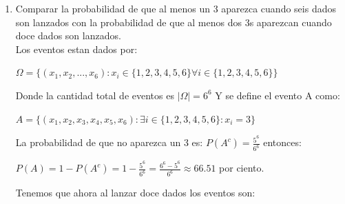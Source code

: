 \documentclass[12pt,a4paper]{report}
\begin{document}
\begin{enumerate}
{\begin{enumerate}[label=\alph*) ]
{\begin{center}
$P(A)=1-P(A^c)=1-\frac{5^4}{6^4}=\frac{6^4-5^4}{6^4}=\frac{671}{1296} $
\end{center}
Ahora, tenemos que el conjunto $\Omega_{1}$ de eventos es:\\
\begin{center}
$\Omega_{1} = \lbrace (x_{1},x_{2},...,x_{24}) : x_{i}\in R^2 \ i \in  \lbrace 1,2,...,24 \rbrace \rbrace$
\end{center}
Donde cada $x_{i}$ elemento de la sucesion de tiros es el tiro de dos dados $(x_{i_{1}},x_{i_{2}})$.
Al tirar dos dados hay así $6^2$ posibilidades y al ser 24 tiros son $(6^2)^{24}$ posibilidades. La probabilidad de que no se obtenga ningun doble cinco esta dada por:\\
\begin{center}
$P(B^c)= \frac{(5^2)^{24}}{(6^2)^{24}}=(\frac{25}{36})^{24}$
\end{center}
Entonces la probabilidad de que salga al menos un doble 5 es:\\
\begin{center}
$1-(\frac{25}{36})^{24}=\frac{1}{1}-\frac{5^{48}}{6^{48}}=\frac{6^{48}-5^{48}}{6^{48}}\approx 99.98$ por ciento.
\end{center}
    } 
    \item{Comparar la probabilidad de que al menos un 3 aparezca cuando seis dados son lanzados con la probabilidad de que al menos dos 3s aparezcan cuando doce dados son lanzados.\\
    Los eventos estan dados por: \\
    \begin{center}
    $\Omega = \lbrace (x_{1},x_{2},...,x_{6}): x_{i}\in \lbrace 1,2,3,4,5,6\rbrace \forall i\in \lbrace 1,2,3,4,5,6 \rbrace \rbrace$
    \end{center}
    Donde la cantidad total de eventos es $|\Omega|=6^6$
    Y se define el evento A como:\\
    \begin{center}
    $A = \lbrace (x_{1},x_{2},x_{3},x_{4},x_{5},x_{6}):\exists i\in \lbrace 1,2,3,4,5,6 \rbrace : x_{i}=3 \rbrace$
    \end{center}
    La probabilidad de que no aparezca un 3 es: $P(A^c)= \frac{5^6}{6^6}$ entonces: \\
    \begin{center}
    $P(A)=1-P(A^c)=1-\frac{5^6}{6^6}=\frac{6^6-5^6}{6^6}\approx 66.51 $ por ciento.
    \end{center}
    Tenemos que ahora al lanzar doce dados los eventos son:\\
}
\end{enumerate}}
\end{enumerate}
\end{document}
